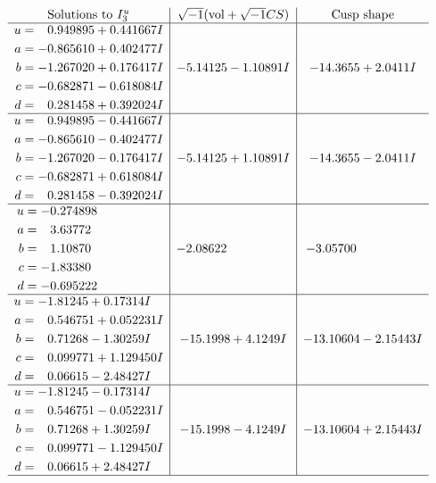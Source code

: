\documentclass[1p]{elsarticle_modified}
\theoremstyle{definition}
\newcommand{\I}{\sqrt{-1}}
\begin{document}
$$\begin{array}{c|c|c}  
\text{Solutions to }I^u_{3}& \I (\text{vol} + \sqrt{-1}CS) & \text{Cusp shape}\\
 \hline 
\begin{aligned}
u &= \phantom{-}0.949895 + 0.441667 I \\
a &= -0.865610 + 0.402477 I \\
b &= -1.267020 + 0.176417 I \\
c &= -0.682871 - 0.618084 I \\
d &= \phantom{-}0.281458 + 0.392024 I\end{aligned}
 & -5.14125 - 1.10891 I & -14.3655 + 2.0411 I \\ \hline\begin{aligned}
u &= \phantom{-}0.949895 - 0.441667 I \\
a &= -0.865610 - 0.402477 I \\
b &= -1.267020 - 0.176417 I \\
c &= -0.682871 + 0.618084 I \\
d &= \phantom{-}0.281458 - 0.392024 I\end{aligned}
 & -5.14125 + 1.10891 I & -14.3655 - 2.0411 I \\ \hline\begin{aligned}
u &= -0.274898\phantom{ +0.000000I} \\
a &= \phantom{-}3.63772\phantom{ +0.000000I} \\
b &= \phantom{-}1.10870\phantom{ +0.000000I} \\
c &= -1.83380\phantom{ +0.000000I} \\
d &= -0.695222\phantom{ +0.000000I}\end{aligned}
 & -2.08622\phantom{ +0.000000I} & -3.05700\phantom{ +0.000000I} \\ \hline\begin{aligned}
u &= -1.81245 + 0.17314 I \\
a &= \phantom{-}0.546751 + 0.052231 I \\
b &= \phantom{-}0.71268 - 1.30259 I \\
c &= \phantom{-}0.099771 + 1.129450 I \\
d &= \phantom{-}0.06615 - 2.48427 I\end{aligned}
 & -15.1998 + 4.1249 I & -13.10604 - 2.15443 I \\ \hline\begin{aligned}
u &= -1.81245 - 0.17314 I \\
a &= \phantom{-}0.546751 - 0.052231 I \\
b &= \phantom{-}0.71268 + 1.30259 I \\
c &= \phantom{-}0.099771 - 1.129450 I \\
d &= \phantom{-}0.06615 + 2.48427 I\end{aligned}
 & -15.1998 - 4.1249 I & -13.10604 + 2.15443 I\\
 \hline 
 \end{array}$$\newpage\newpage\renewcommand{\arraystretch}{1}
\end{document}
